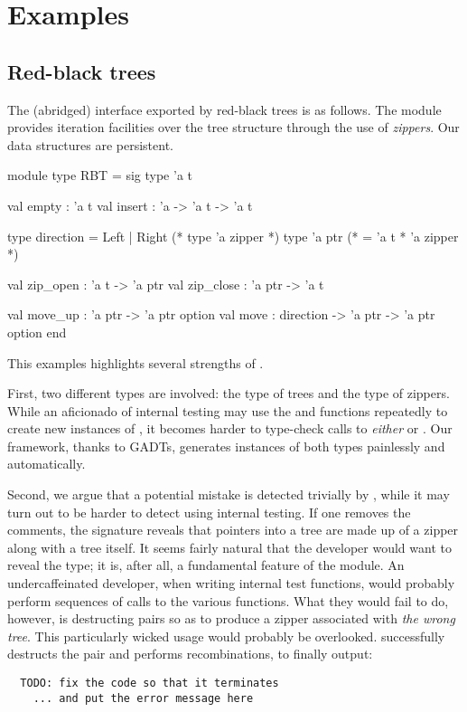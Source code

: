 \section{Examples}

\subsection{Red-black trees}
The (abridged) interface exported by red-black trees is as follows. The module
provides iteration facilities over the tree structure through the use of
\emph{zippers}. Our data structures are persistent.
%
\begin{ocamlcode}
module type RBT = sig
  type 'a t

  val empty : 'a t
  val insert : 'a -> 'a t -> 'a t

  type direction = Left | Right
  (* type 'a zipper *)
  type 'a ptr (* = 'a t * 'a zipper *)

  val zip_open : 'a t -> 'a ptr
  val zip_close : 'a ptr -> 'a t

  val move_up : 'a ptr -> 'a ptr option
  val move : direction -> 'a ptr -> 'a ptr option
end
\end{ocamlcode}
%
This examples highlights several strengths of \arti.

First, two different types are involved: the type of trees and the type of
zippers. While an aficionado of internal testing may use the  and
 functions repeatedly to create new instances of , it
becomes harder to type-check calls to \emph{either}  or
. Our framework, thanks to GADTs, generates instances of both
types painlessly and automatically.

Second, we argue that a potential mistake is detected trivially by \arti, while
it may turn out to be harder to detect using internal testing. If one removes
the comments, the signature reveals that pointers into a tree are made up of a
zipper along with a tree itself. It seems fairly natural that the developer
would want to reveal the  type; it is, after all, a fundamental
feature of the module. An undercaffeinated developer, when writing internal test
functions, would probably perform sequences of calls to the various functions.
What they would fail to do, however, is destructing pairs so as to produce
a zipper associated with \emph{the wrong tree}. This particularly wicked usage
would probably be overlooked. \arti successfully destructs the pair and performs
recombinations, to finally output:
\begin{verbatim}
  TODO: fix the code so that it terminates
    ... and put the error message here
\end{verbatim}

